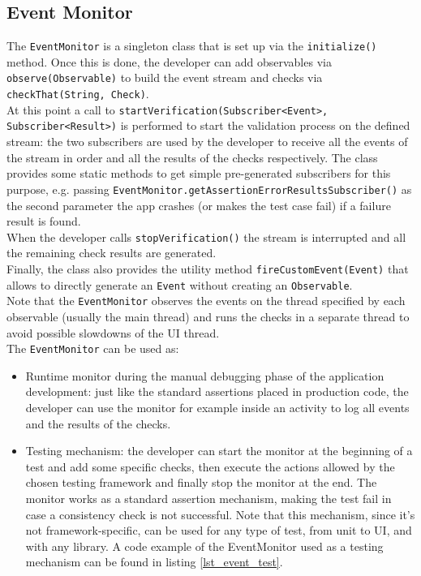 \documentclass[11pt,a4paper,notitlepage]{article}
\begin{document}
\subsection{Event Monitor}
The \texttt{EventMonitor} is a singleton class that is set up via the \texttt{initialize()} method. Once this is done, the developer can add observables via \texttt{observe(Observable)} to build the event stream and checks via \texttt{checkThat(String, Check)}.\medskip \\
At this point a call to \texttt{startVerification(Subscriber<Event>, Subscriber<Result>)} is performed to start the validation process on the defined stream: the two subscribers are used by the developer to receive all the events of the stream in order and all the results of the checks respectively. The class provides some static methods to get simple pre-generated subscribers for this purpose, e.g. passing \texttt{EventMonitor.getAssertionErrorResultsSubscriber()} as the second parameter the app crashes (or makes the test case fail) if a failure result is found.\medskip \\
When the developer calls \texttt{stopVerification()} the stream is interrupted and all the remaining check results are generated.\medskip \\
Finally, the class also provides the utility method \texttt{fireCustomEvent(Event)} that allows to directly generate an \texttt{Event} without creating an \texttt{Observable}.\medskip \\
Note that the \texttt{EventMonitor} observes the events on the thread specified by each observable (usually the main thread) and runs the checks in a separate thread to avoid possible slowdowns of the UI thread.\medskip \\
The \texttt{EventMonitor} can be used as:
\begin{itemize}
	\item Runtime monitor during the manual debugging phase of the application development: just like the standard assertions placed in production code, the developer can use the monitor for example inside an activity to log all events and the results of the checks.
	\item Testing mechanism: the developer can start the monitor at the beginning of a test and add some specific checks, then execute the actions allowed by the chosen testing framework and finally stop the monitor at the end. The monitor works as a standard assertion mechanism, making the test fail in case a consistency check is not successful. Note that this mechanism, since it's not framework-specific, can be used for any type of test, from unit to UI, and with any library. A code example of the EventMonitor used as a testing mechanism can be found in listing \ref{lst_event_test}.
\end{itemize}
\end{document}
